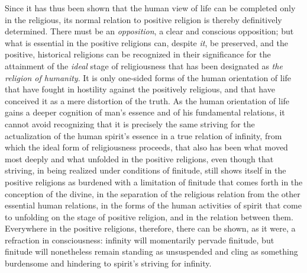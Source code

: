 \documentclass[12pt,a4paper,openany]{book}
\newcommand{\opage}[1]{\marginnote{\footnotesize\textit{[#1]}}}
\begin{document}
Since it has thus been shown that the human view of life
can be completed only in the religious, its normal
\opage{508}relation to positive religion is thereby definitively determined. There must
be an \emph{opposition}, a clear and conscious opposition;
but what is essential in the positive religions can, despite \emph{it},
be preserved, and the positive, historical religions can be recognized
in their significance for the attainment of the \emph{ideal}
stage of religiousness that has been designated as \emph{the religion
of humanity}. It is only one-sided forms of the
human orientation of life that have fought in hostility against the
positively religious, and that have conceived it as a mere
distortion of the truth. As the human orientation of life
gains a deeper cognition of man's essence and of
his fundamental relations, it cannot avoid recognizing that
it is precisely the same striving for the actualization of the
human spirit's essence in a true relation of infinity, from
which the ideal form of religiousness proceeds, that also
has been what moved most deeply and what unfolded in the positive
religions, even though that striving, in being realized under conditions of finitude,
still shows itself in the positive religions as
burdened with a limitation of finitude that comes forth
in the conception of the divine, in the separation of the religious relation
from the other essential human relations, in the
forms of the human activities of spirit that come to
unfolding on the stage of positive religion, and in the relation
between them. Everywhere in the positive religions, therefore, there
can be shown, as it were, a refraction in consciousness: infinity
will momentarily pervade finitude, but
finitude will nonetheless remain standing as unsuspended and cling as something
burdensome and hindering to spirit's striving for infinity.
\end{document}
